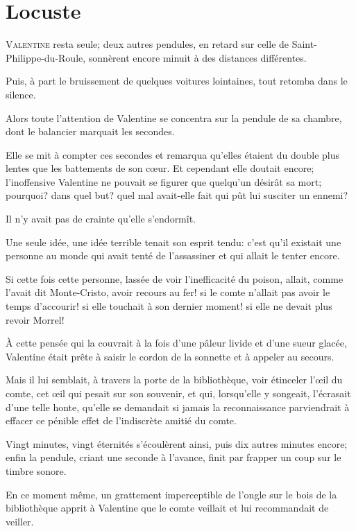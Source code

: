 \chapter{Locuste}

\lettrine{V}{alentine} resta seule; deux autres pendules, en retard sur celle de Saint-Philippe-du-Roule, sonnèrent encore minuit à des distances différentes. 

\zz
Puis, à part le bruissement de quelques voitures lointaines, tout retomba dans le silence. 

Alors toute l'attention de Valentine se concentra sur la pendule de sa chambre, dont le balancier marquait les secondes. 

Elle se mit à compter ces secondes et remarqua qu'elles étaient du double plus lentes que les battements de son cœur. Et cependant elle doutait encore; l'inoffensive Valentine ne pouvait se figurer que quelqu'un désirât sa mort; pourquoi? dans quel but? quel mal avait-elle fait qui pût lui susciter un ennemi? 

Il n'y avait pas de crainte qu'elle s'endormît. 

Une seule idée, une idée terrible tenait son esprit tendu: c'est qu'il existait une personne au monde qui avait tenté de l'assassiner et qui allait le tenter encore. 

Si cette fois cette personne, lassée de voir l'inefficacité du poison, allait, comme l'avait dit Monte-Cristo, avoir recours au fer! si le comte n'allait pas avoir le temps d'accourir! si elle touchait à son dernier moment! si elle ne devait plus revoir Morrel! 

À cette pensée qui la couvrait à la fois d'une pâleur livide et d'une sueur glacée, Valentine était prête à saisir le cordon de la sonnette et à appeler au secours. 

Mais il lui semblait, à travers la porte de la bibliothèque, voir étinceler l'œil du comte, cet œil qui pesait sur son souvenir, et qui, lorsqu'elle y songeait, l'écrasait d'une telle honte, qu'elle se demandait si jamais la reconnaissance parviendrait à effacer ce pénible effet de l'indiscrète amitié du comte. 

Vingt minutes, vingt éternités s'écoulèrent ainsi, puis dix autres minutes encore; enfin la pendule, criant une seconde à l'avance, finit par frapper un coup sur le timbre sonore. 

En ce moment même, un grattement imperceptible de l'ongle sur le bois de la bibliothèque apprit à Valentine que le comte veillait et lui recommandait de veiller. 

